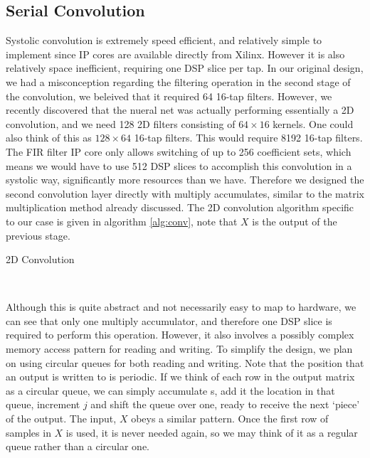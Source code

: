\subsection{Serial Convolution}
Systolic convolution is extremely speed efficient, and relatively simple to implement since IP cores are available directly from Xilinx.  However it is also relatively space inefficient, requiring one DSP slice per tap.  In our original design, we had a misconception regarding the filtering operation in the second stage of the convolution, we beleived that it required 64 16-tap filters.  However, we recently discovered that the nueral net was actually performing essentially a 2D convolution, and we need 128 2D filters consisting of $64\times 16$ kernels.  One could also think of this as $128\times 64$ 16-tap filters.  This would require 8192 16-tap filters.  The FIR filter IP core only allows switching of up to 256 coefficient sets, which means we would have to use 512 DSP slices to accomplish this convolution in a systolic way, significantly more resources than we have.  Therefore we designed the second convolution layer directly with multiply accumulates, similar to the matrix multiplication method already discussed.
The 2D convolution algorithm specific to our case is given in algorithm \ref{alg:conv}, note that $X$ is the output of the previous stage.\\


\begin{spacing}{1.0}
\begin{algorithm}
\begin{algorithmic}[1]
    \caption{2D Convolution}
     \
            \EndFor
        \EndFor
    \EndFor
\end{algorithmic}
\end{algorithm}
\label{alg:conv}
\end{spacing}

Although this is quite abstract and not necessarily easy to map to hardware, we can see that only one multiply accumulator, and therefore one DSP slice is required to perform this operation.  However, it also involves a possibly complex memory access pattern for reading and writing.  To simplify the design, we plan on using circular queues for both reading and writing.  Note that the position that an output is written to is periodic.  If we think of each row in the output matrix as a circular queue, we can simply accumulate s, add it the location in that queue, increment $j$ and shift the queue over one, ready to receive the next `piece' of the output.  The input, $X$ obeys a similar pattern.  Once the first row of samples in $X$ is used, it is never needed again, so we may think of it as a regular queue rather than a circular one.

